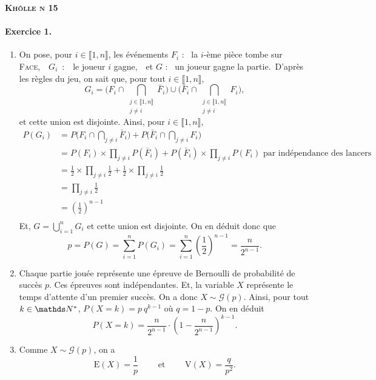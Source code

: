 \documentclass[a4paper]{article}
\def\khollenum{15}
\begin{document}
	\begin{center}
		\bfseries\scshape\Huge Khôlle n \khollenum
	\end{center}

	\paragraph{Exercice 1.}
	\begin{enumerate}
		\item On pose, pour $i \in \llbracket 1,n \rrbracket$, les événements $F_i$\/ : \guillemotleft~la $i$-ème pièce tombe sur \textsc{Face},~\guillemotright\ $G_i$\/~:~\guillemotleft~le joueur $i$ gagne,~\guillemotright\ et $G$ : \guillemotleft~un joueur gagne la partie.~\guillemotright\@ D'après les règles du jeu, on sait que, pour tout $i \in \llbracket 1,n \rrbracket$, \[
				G_i = \Big( F_i \cap \bigcap_{\substack{j \in \llbracket 1,n \rrbracket\\ j \neq i}} \bar{F}_i \Big) \cup \Big( \bar{F}_i \cap \bigcap_{\substack{j \in \llbracket 1,n \rrbracket\\ j \neq i}} F_i\Big)
			,\] et cette union est disjointe. Ainsi, pour $i \in \llbracket 1,n \rrbracket$,
			\begin{align*}
				P(G_i) &= P\Big(F_i \cap \bigcap_{j \neq i} \bar{F}_i\Big) + P\Big(\bar{F}_i \cap \bigcap_{j \neq i} F_i\Big)\\
				&= P(F_i) \times \prod_{j \neq i} P(\bar{F}_i) + P(\bar{F}_i) \times \prod_{j \neq i} P(F_i) \text{ par indépendance des lancers } \\
				&= \frac{1}{2} \times \prod_{j \neq i} \frac{1}{2} + \frac{1}{2} \times \prod_{j \neq i} \frac{1}{2} \\
				&= \prod_{j \neq i} \frac{1}{2} \\
				&= \left(\frac{1}{2}\right)^{n-1} \\
			\end{align*}
			Et, $G = \bigcup_{i = 1}^n G_i$\/ et cette union est disjointe.
			On en déduit donc que \[
				p = P(G) = \sum_{i=1}^n P(G_i) = \sum_{i=1}^n \left(\frac{1}{2}\right)^{n-1} = \frac{n}{2^{n-1}}
			.\]
		\item Chaque partie jouée représente une épreuve de Bernoulli de probabilité de succès $p$.
			Ces épreuves sont indépendantes.
			Et, la variable $X$\/ représente le temps d'attente d'un premier succès.
			On a donc $X \sim \mathcal{G}(p)$.
			Ainsi, pour tout $k \in \N^*$, $P(X = k) = p\:q^{k-1}$\/ où $q = 1 - p$.
			On en déduit \[
				P(X = k) = \frac{n}{2^{n-1}} \cdot \left( 1 - \frac{n}{2^{n-1}} \right)^{k-1}
			.\]
		\item Comme $X \sim \mathcal{G}(p)$, on a \[
				\mathrm{E}(X) = \frac{1}{p} \quad\quad \text{ et } \quad\quad \mathrm{V}(X) = \frac{q}{p^2}
			.\]
	\end{enumerate}
\end{document}
